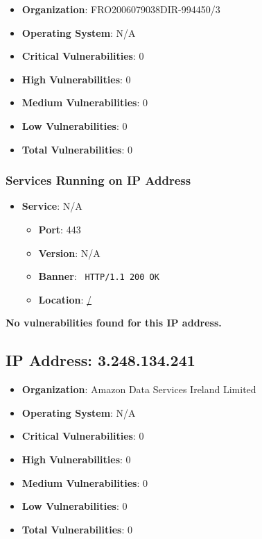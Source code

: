 \documentclass{article}
\begin{document}
\begin{itemize}
    \item \textbf{Organization}: FRO2006079038DIR-994450/3
    \item \textbf{Operating System}:  N/A 
    \item \textbf{Critical Vulnerabilities}: 0
    \item \textbf{High Vulnerabilities}: 0
    \item \textbf{Medium Vulnerabilities}: 0
    \item \textbf{Low Vulnerabilities}: 0
    \item \textbf{Total Vulnerabilities}: 0
\end{itemize}

\subsubsection*{Services Running on IP Address}

\begin{itemize}
    
        \item \textbf{Service}: N/A
        \begin{itemize}
            \item \textbf{Port}: 443
            \item \textbf{Version}:  N/A 
            \item \textbf{Banner}: \texttt{ HTTP/1.1 200 OK
 }
            \item \textbf{Location}: \href{ / }{ / }
        \end{itemize}
    
\end{itemize}


\textbf{No vulnerabilities found for this IP address.}


\clearpage



\subsection*{IP Address: 3.248.134.241}

\begin{itemize}
    \item \textbf{Organization}: Amazon Data Services Ireland Limited
    \item \textbf{Operating System}:  N/A 
    \item \textbf{Critical Vulnerabilities}: 0
    \item \textbf{High Vulnerabilities}: 0
    \item \textbf{Medium Vulnerabilities}: 0
    \item \textbf{Low Vulnerabilities}: 0
    \item \textbf{Total Vulnerabilities}: 0
\end{itemize}
\end{document}
